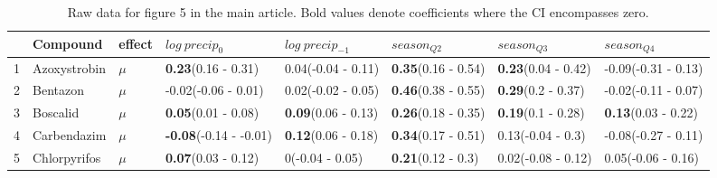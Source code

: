 \begingroup\fontsize{8pt}{10pt}\selectfont
\begin{longtable}{lp{2cm}p{0.7cm}p{2cm}p{2cm}p{2cm}p{2cm}p{2cm}}
\caption{Raw data for figure 5 in the main article. 
                     Bold values denote coefficients where the CI encompasses zero.} \\ 
  \toprule
 & Compound & effect & $log~precip_0$ & $log~ precip_{-1}$ & $season_{Q2}$ & $season_{Q3}$ & $season_{Q4}$ \\ 
  \midrule
1 & Azoxystrobin & $\mu$ & \textbf{0.23}\newline (0.16 - 0.31) & 0.04\newline (-0.04 - 0.11) & \textbf{0.35}\newline (0.16 - 0.54) & \textbf{0.23}\newline (0.04 - 0.42) & -0.09\newline (-0.31 - 0.13) \\ 
  2 & Bentazon & $\mu$ & -0.02\newline (-0.06 - 0.01) & 0.02\newline (-0.02 - 0.05) & \textbf{0.46}\newline (0.38 - 0.55) & \textbf{0.29}\newline (0.2 - 0.37) & -0.02\newline (-0.11 - 0.07) \\ 
  3 & Boscalid & $\mu$ & \textbf{0.05}\newline (0.01 - 0.08) & \textbf{0.09}\newline (0.06 - 0.13) & \textbf{0.26}\newline (0.18 - 0.35) & \textbf{0.19}\newline (0.1 - 0.28) & \textbf{0.13}\newline (0.03 - 0.22) \\ 
  4 & Carbendazim & $\mu$ & \textbf{-0.08}\newline (-0.14 - -0.01) & \textbf{0.12}\newline (0.06 - 0.18) & \textbf{0.34}\newline (0.17 - 0.51) & 0.13\newline (-0.04 - 0.3) & -0.08\newline (-0.27 - 0.11) \\ 
  5 & Chlorpyrifos & $\mu$ & \textbf{0.07}\newline (0.03 - 0.12) & 0\newline (-0.04 - 0.05) & \textbf{0.21}\newline (0.12 - 0.3) & 0.02\newline (-0.08 - 0.12) & 0.05\newline (-0.06 - 0.16) \\ 

\end{longtable}
